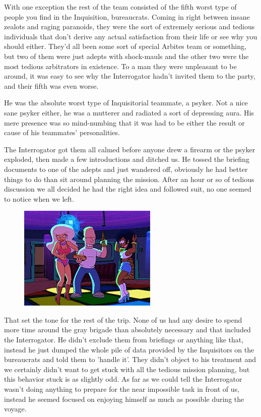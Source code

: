 With one exception the rest of the team consisted of the fifth worst type of people you find in the Inquisition, bureaucrats. 
Coming in right between insane zealots and raging paranoids, they were the sort of extremely serious and tedious individuals that don't derive any actual satisfaction from their life or see why you should either. 
They'd all been some sort of special Arbites team or something, but two of them were just adepts with shock-mauls and the other two were the most tedious arbitrators in existence. 
To a man they were unpleasant to be around, it was easy to see why the Interrogator hadn't invited them to the party, and their fifth was even worse.

He was the absolute worst type of Inquisitorial teammate, a psyker. 
Not a nice sane psyker either, he was a mutterer and radiated a sort of depressing aura. 
His mere presence was so mind-numbing that it was had to be either the result or cause of his teammates' personalities.

The Interrogator got them all calmed before anyone drew a firearm or the psyker exploded, then made a few introductions and ditched us. 
He tossed the briefing documents to one of the adepts and just wandered off, obviously he had better things to do than sit around planning the mission. 
After an hour or so of tedious discussion we all decided he had the right idea and followed suit, no one seemed to notice when we left.

\begin{figure}
	\begin{center}
		\includegraphics[width=\figwidth]{pics/9/6.png}
	\end{center}
\end{figure}
That set the tone for the rest of the trip. 
None of us had any desire to spend more time around the gray brigade than absolutely necessary and that included the Interrogator. 
He didn't exclude them from briefings or anything like that, instead he just dumped the whole pile of data provided by the Inquisitors on the bureaucrats and told them to 'handle it'. 
They didn't object to his treatment and we certainly didn't want to get stuck with all the tedious mission planning, but this behavior stuck is as slightly odd. 
As far as we could tell the Interrogator wasn't doing anything to prepare for the near impossible task in front of us, instead he seemed focused on enjoying himself as much as possible during the voyage.

